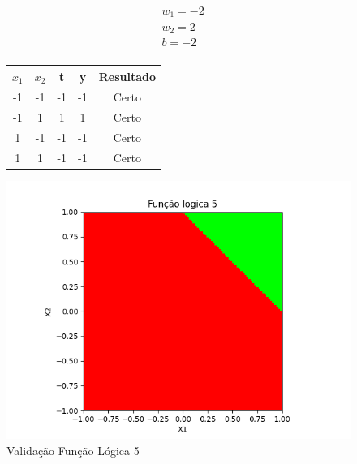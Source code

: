 \begin{figure}[h!]
\centering
\begin{minipage}[c]{0.49\linewidth}
\centering
\[
\begin{aligned}
&w_1 = -2\\
&w_2 = 2\\
&b = -2\\
\end{aligned}
\]
\begin{tabular}{|c|c|c|c|c|}\hline
$x_1$ & $x_2$ & t & y & Resultado\\ \hline
 -1 & -1 & -1 & -1 & Certo\\ \hline
 -1 & 1 & 1 & 1 & Certo\\ \hline
 1 & -1 & -1 & -1 & Certo\\ \hline
 1 & 1 & -1 & -1 & Certo\\ \hline
\end{tabular}
\end{minipage}
\hfill
\begin{minipage}[c]{0.5\linewidth}
\centering
\singlespacing
\includegraphics[width=1.2\textwidth]{im/im5}
\end{minipage}
\caption{Validação Função Lógica 5}
\label{vl5}
\end{figure}

